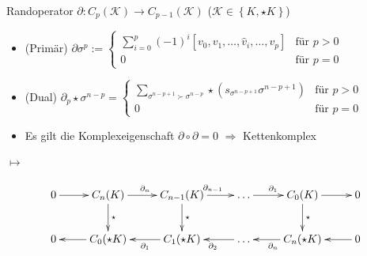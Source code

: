 \documentclass[handout]{beamer}
\begin{document}
  \begin{frame}
    \begin{block}{Randoperator \( \partial: C_{p}(\mathcal{K}) \rightarrow C_{p-1}(\mathcal{K}) \) \quad(\(\mathcal{K}\in\left\{ K, \star K \right\}  \))} 
      \begin{itemize}
        \item<1-> (Primär) \(  \partial\sigma^{p} :=
                                \begin{cases}
                                  \sum\limits_{i=0}^{p} (-1)^{i} \left[ v_{0}, v_{1}, \ldots, \hat{v}_{i}, \ldots, v_{p} \right] & \text{für } p>0 \\
                                  0 & \text{für } p=0
                                \end{cases}
                            \)
        \item<2-> (Dual) \( \partial_{p}\star\sigma^{n-p} =  
                               \begin{cases}
                                  \sum\limits_{\sigma^{n-p+1} \succ \sigma^{n-p}} \star \left( s_{\sigma^{n-p+1}} \sigma^{n-p+1} \right) & \text{für } p>0 \\
                                  0 & \text{für } p=0
                                \end{cases}
                          \)
        \item<3-> Es gilt die Komplexeigenschaft \( \partial\circ\partial = 0 \) \quad\( \Rightarrow \) Kettenkomplex
      \end{itemize}
    \end{block}
    \begin{overprint}
        \begin{minipage}{0.4\textwidth}
          \centering 
        \end{minipage}\hfill
       {\Huge\(\longmapsto\)}  \hfill
       \begin{minipage}{0.4\textwidth}
          \centering 
        \end{minipage}
          \begin{align*}
      \begin{xy}
        \xymatrix{
          0 \ar[r] & 
          C_{n}(K) \ar[r]^{\partial_{n}} \ar[d]^{\star} & 
          C_{n-1}(K) \ar[r]^{\partial_{n-1}} \ar[d]^{\star} & 
          \ldots \ar[r]^{\partial_{1}} & 
          C_{0}(K) \ar[r] \ar[d]^{\star} &
          0 \\
          0  & 
          C_{0}(\star K) \ar[l] & 
          C_{1}( \star K) \ar[l]^{\partial_{1}} & 
          \ldots \ar[l]^{\partial_{2}} & 
          C_{n}(\star K) \ar[l]^{\partial_{n}} &
          0 \ar[l]
        }
      \end{xy}
    \end{align*}
    \end{overprint}
  \end{frame}
\end{document}
